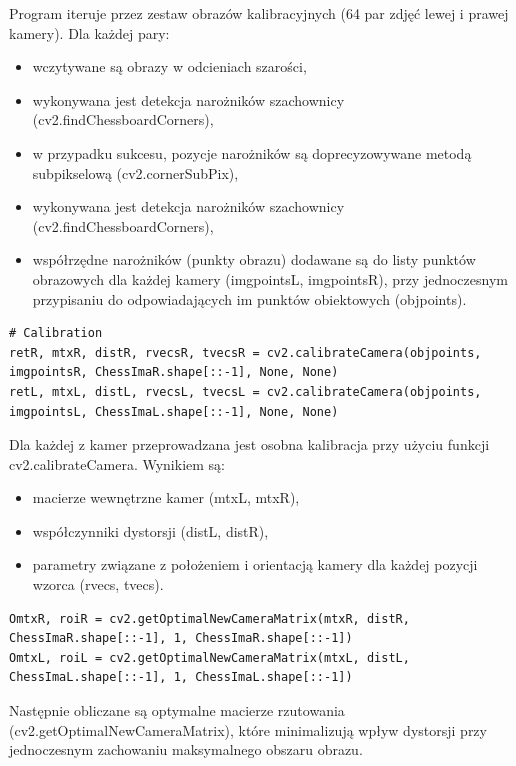 \documentclass[magisterska]{pracadypl}
\begin{document}
Program iteruje przez zestaw obrazów kalibracyjnych (64 par zdjęć lewej i prawej kamery). Dla każdej pary:

\begin{itemize}
    \item wczytywane są obrazy w odcieniach szarości,
    \item wykonywana jest detekcja narożników szachownicy (cv2.findChessboardCorners),
    \item w przypadku sukcesu, pozycje narożników są doprecyzowywane metodą subpikselową (cv2.cornerSubPix),
    \item wykonywana jest detekcja narożników szachownicy (cv2.findChessboardCorners),
    \item współrzędne narożników (punkty obrazu) dodawane są do listy punktów obrazowych dla każdej kamery (imgpointsL, imgpointsR), przy jednoczesnym przypisaniu do odpowiadających im punktów obiektowych (objpoints).
\end{itemize}

\begin{lstlisting}[style=mypython]
# Calibration
retR, mtxR, distR, rvecsR, tvecsR = cv2.calibrateCamera(objpoints, imgpointsR, ChessImaR.shape[::-1], None, None)
retL, mtxL, distL, rvecsL, tvecsL = cv2.calibrateCamera(objpoints, imgpointsL, ChessImaL.shape[::-1], None, None)
\end{lstlisting}

Dla każdej z kamer przeprowadzana jest osobna kalibracja przy użyciu funkcji cv2.calibrateCamera. Wynikiem są:

\begin{itemize}
    \item macierze wewnętrzne kamer (mtxL, mtxR),
    \item współczynniki dystorsji (distL, distR),
    \item parametry związane z położeniem i orientacją kamery dla każdej pozycji wzorca (rvecs, tvecs).
\end{itemize}

\begin{lstlisting}[style=mypython]
OmtxR, roiR = cv2.getOptimalNewCameraMatrix(mtxR, distR, ChessImaR.shape[::-1], 1, ChessImaR.shape[::-1])
OmtxL, roiL = cv2.getOptimalNewCameraMatrix(mtxL, distL, ChessImaL.shape[::-1], 1, ChessImaL.shape[::-1])
\end{lstlisting}

Następnie obliczane są optymalne macierze rzutowania (cv2.getOptimalNewCameraMatrix), które minimalizują wpływ dystorsji przy jednoczesnym zachowaniu maksymalnego obszaru obrazu.
\end{document}
